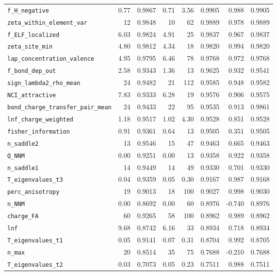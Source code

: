 \begin{table}[p]
\begin{tabular}{lrrrrrrr}
\texttt{f\_H\_negative} & 0.77 & 0.9867 & 0.71 & 3.56 & 0.9905 & 0.988 & 0.9905 \\
\texttt{zeta\_within\_element\_var} & 12 & 0.9848 & 10 & 62 & 0.9889 & 0.978 & 0.9889 \\
\texttt{f\_ELF\_localized} & 6.03 & 0.9824 & 4.91 & 25 & 0.9837 & 0.967 & 0.9837 \\
\texttt{zeta\_site\_min} & 4.80 & 0.9812 & 4.34 & 18 & 0.9820 & 0.994 & 0.9820 \\
\texttt{lap\_concentration\_valence} & 4.95 & 0.9795 & 6.46 & 78 & 0.9768 & 0.972 & 0.9768 \\
\texttt{f\_bond\_dep\_out} & 2.58 & 0.9343 & 1.36 & 13 & 0.9625 & 0.932 & 0.9541 \\
\texttt{sign\_lambda2\_rho\_mean} & 24 & 0.9482 & 21 & 112 & 0.9585 & 0.948 & 0.9582 \\
\texttt{NCI\_attractive} & 7.83 & 0.9333 & 6.28 & 19 & 0.9576 & 0.906 & 0.9575 \\
\texttt{bond\_charge\_transfer\_pair\_mean} & 24 & 0.9433 & 22 & 95 & 0.9535 & 0.913 & 0.9861 \\
\texttt{lnf\_charge\_weighted} & 1.18 & 0.9517 & 1.02 & 4.30 & 0.9528 & 0.851 & 0.9528 \\
\texttt{fisher\_information} & 0.91 & 0.9361 & 0.64 & 13 & 0.9505 & 0.351 & 0.9505 \\
\texttt{n\_saddle2} & 13 & 0.9546 & 15 & 47 & 0.9463 & 0.665 & 0.9463 \\
\texttt{Q\_NNM} & 0.00 & 0.9251 & 0.00 & 13 & 0.9358 & 0.922 & 0.9358 \\
\texttt{n\_saddle1} & 14 & 0.9449 & 14 & 49 & 0.9330 & 0.701 & 0.9330 \\
\texttt{T\_eigenvalues\_t3} & 0.04 & 0.9359 & 0.05 & 0.30 & 0.9167 & 0.987 & 0.9168 \\
\texttt{perc\_anisotropy} & 19 & 0.9013 & 18 & 100 & 0.9027 & 0.998 & 0.9030 \\
\texttt{n\_NNM} & 0.00 & 0.8692 & 0.00 & 60 & 0.8976 & -0.740 & 0.8976 \\
\texttt{charge\_FA} & 60 & 0.9265 & 58 & 100 & 0.8962 & 0.989 & 0.8962 \\
\texttt{lnf} & 9.68 & 0.8742 & 6.16 & 33 & 0.8934 & 0.718 & 0.8934 \\
\texttt{T\_eigenvalues\_t1} & 0.05 & 0.9141 & 0.07 & 0.31 & 0.8704 & 0.992 & 0.8705 \\
\texttt{n\_max} & 20 & 0.8514 & 35 & 75 & 0.7688 & -0.210 & 0.7688 \\
\texttt{T\_eigenvalues\_t2} & 0.03 & 0.7073 & 0.05 & 0.23 & 0.7511 & 0.988 & 0.7511 \\

\end{tabular}
\end{table}
